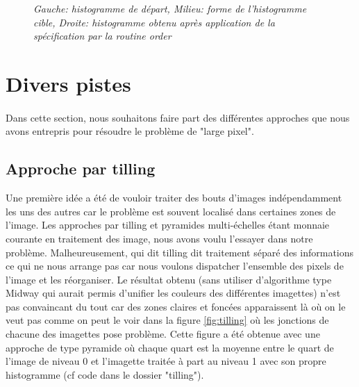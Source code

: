 \documentclass{article}
\begin{document}
\begin{figure}[!hbt]
\begin{minipage}{0.33\textwidth}
\end{minipage}
\caption{\textit{Gauche: histogramme de départ, Milieu: forme de l'histogramme cible, Droite: histogramme obtenu après application de la spécification par la routine order}}
\label{fig:im_xx}
\end{figure}

\section*{Divers pistes}
\paragraph*{}
Dans cette section, nous souhaitons faire part des différentes approches que nous avons entrepris pour résoudre le problème de "large pixel". 

\subsection*{Approche par tilling}
Une première idée a été de vouloir traiter des bouts d'images indépendamment les uns des autres car le problème est souvent localisé dans certaines zones de l'image. Les approches par tilling et pyramides multi-échelles étant monnaie courante en traitement des image, nous avons voulu l'essayer dans notre problème. Malheureusement, qui dit tilling dit traitement séparé des informations ce qui ne nous arrange pas car nous voulons dispatcher l'ensemble des pixels de l'image et les réorganiser. Le résultat obtenu (sans utiliser d'algorithme type Midway qui aurait permis d'unifier les couleurs des différentes imagettes) n'est pas convaincant du tout car des zones claires et foncées apparaissent là où on le veut pas comme on peut le voir dans la figure \ref{fig:tilling} où les jonctions de chacune des imagettes pose problème. Cette figure a été obtenue avec une approche de type pyramide où chaque quart est la moyenne entre le quart de l'image de niveau 0 et l'imagette traitée à part au niveau 1 avec son propre histogramme (cf code dans le dossier "tilling").
\end{document}

